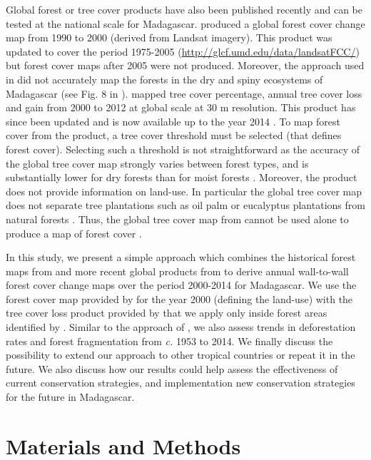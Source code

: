 \documentclass[a4paper, 12pt, leqno]{article}\usepackage[]{graphicx}\usepackage[]{color}
\begin{document}
Global forest or tree cover products have also been published recently
and can be tested at the national scale for
Madagascar. \citet{Kim2014} produced a global forest cover change map
from 1990 to 2000 (derived from Landsat imagery). This product was
updated to cover the period 1975-2005
(\url{http://glcf.umd.edu/data/landsatFCC/}) but forest cover maps
after 2005 were not produced. Moreover, the approach used in
\citet{Kim2014} did not accurately map the forests in the dry and
spiny ecosystems of Madagascar (see Fig. 8 in \citet{Kim2014}).
\citet{Hansen2013} mapped tree cover percentage, annual tree cover
loss and gain from 2000 to 2012 at global scale at 30 m
resolution. This product has since been updated and is now available
up to the year 2014 \citep{Hansen2013}. To map forest cover from the
\citet{Hansen2013} product, a tree cover threshold must be selected
(that defines forest cover). Selecting such a threshold is not
straightforward as the accuracy of the global tree cover map strongly
varies between forest types, and is substantially lower for dry
forests than for moist forests \citep{Bastin2017}. Moreover, the
\citet{Hansen2013} product does not provide information on
land-use. In particular the global tree cover map does not separate
tree plantations such as oil palm or eucalyptus plantations from
natural forests \citep{Tropek2014}. Thus, the global tree cover map
from \citet{Hansen2013} cannot be used alone to produce a map of
forest cover \citep{Tyukavina2017}.

In this study, we present a simple approach which combines the
historical forest maps from \citet{Harper2007} and more recent global
products from \citet{Hansen2013} to derive annual wall-to-wall
forest cover change maps over the period 2000-2014 for Madagascar. We
use the forest cover map provided by \citet{Harper2007} for the year
2000 (defining the land-use) with the tree cover loss product provided
by \citet{Hansen2013} that we apply only inside forest areas
identified by \citet{Harper2007}. Similar to the approach of
\citet{Harper2007}, we also assess trends in deforestation rates and
forest fragmentation from \emph{c.} 1953 to 2014. We finally discuss
the possibility to extend our approach to other tropical countries or
repeat it in the future. We also discuss how our results could help
assess the effectiveness of current conservation strategies, and
implementation new conservation strategies for the future in
Madagascar.

\newpage

\section{Materials and Methods}
\label{materials-and-methods}
\end{document}
